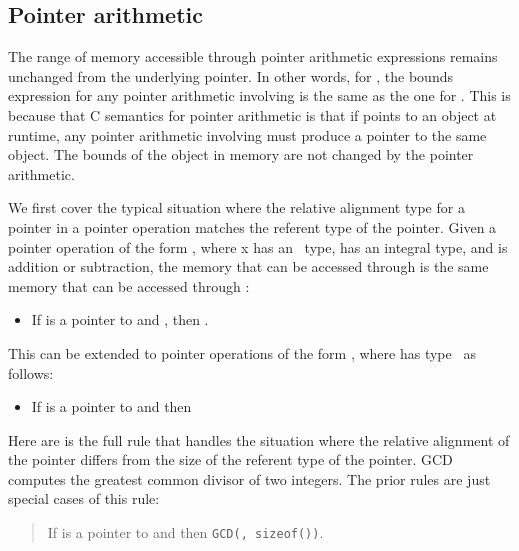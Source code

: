 \subsection{Pointer arithmetic}\label{pointer-arithmetic}

The range of memory accessible through pointer arithmetic expressions
remains unchanged from the underlying pointer. In other words, for
, the bounds expression for any
pointer arithmetic involving  is the same as the one for
. This is because that C semantics for pointer arithmetic is
that if  points to an object at runtime, any pointer arithmetic
involving  must produce a pointer to the same object. The bounds
of the object in memory are not changed by the pointer arithmetic.

We first cover the typical situation where the relative alignment type
for a pointer in a pointer operation matches the referent type of the
pointer. Given a pointer operation of the form , where x
has an \arrayptr\ type,  has an integral type, and
 is addition or subtraction, the memory that can be accessed
through  is the same memory that can be accessed through
:

\begin{itemize}
\item
  If  is a pointer to  and 
  ,
  then .
\end{itemize}

This can be extended to pointer operations of the form ,
where  has type
\arrayptrT\ as
follows:

\begin{itemize}
\item
  If  is a pointer to  and 
  then 
\end{itemize}

Here are is the full rule that handles the situation where the relative
alignment of the pointer differs from the size of the referent type of
the pointer. GCD computes the greatest common divisor of two integers.
The prior rules are just special cases of this rule:

\begin{quote}
If  is a pointer to  and 
            {
                       {}
                       {}}
then 
                 {
                            {}
                            {\texttt{GCD(, sizeof())}}}.
\end{quote}


